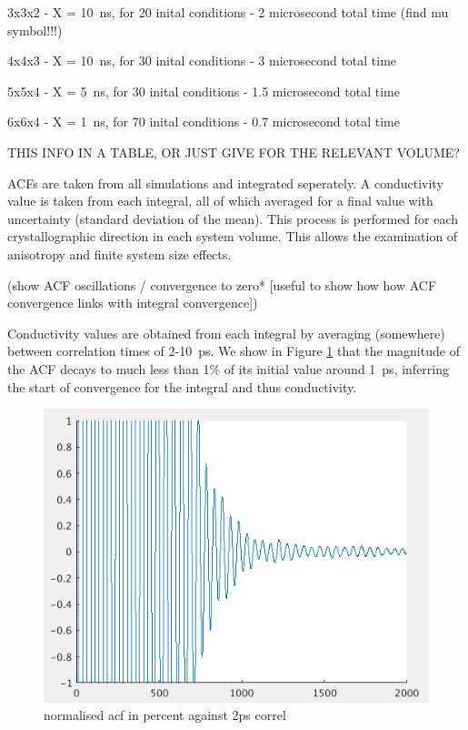 \documentclass[%
preprint,                                  %
nofootinbib,
 amsmath,amssymb,
 aps,
]{revtex4-1}
\begin{document}
3x3x2 - X = 10~ns, for 20 inital conditions - 2 microsecond total time (find mu symbol!!!)

4x4x3 - X = 10~ns, for 30 inital conditions - 3 microsecond total time

5x5x4 - X = 5~ns, for 30 inital conditions - 1.5 microsecond total time

6x6x4 - X = 1~ns, for 70 inital conditions - 0.7 microsecond total time

THIS INFO IN A TABLE, OR JUST GIVE FOR THE RELEVANT VOLUME?


ACFs are taken from all simulations and integrated seperately. A conductivity value is taken from each integral, all of which averaged for a final value with uncertainty (standard deviation of the mean). This process is performed for each crystallographic direction in each system volume. This allows the examination of anisotropy and finite system size effects.

(show ACF oscillations / convergence to zero* [useful to show how how ACF convergence links with integral convergence])

Conductivity values are obtained from each integral by averaging (somewhere) between correlation times of 2-10~ps. We show in Figure \ref{fig:acf_decay} that the magnitude of the ACF decays to much less than 1\% of its initial value around 1~ps, inferring the start of convergence for the integral and thus conductivity. %

\begin{figure}[h!]
  \includegraphics[width=\linewidth]{images/acf_decay_percent_correl.png}
  \caption{normalised acf in percent against 2ps correl}
  \label{fig:acf_decay}
\end{figure}
\end{document}
